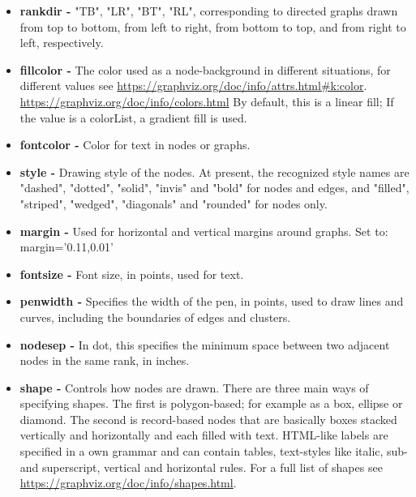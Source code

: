 \documentclass[a4paper, 12pt, bibliography=totoc]{scrartcl}
\begin{document}
\begin{itemize}
	\item \textbf{rankdir -} "TB", "LR", "BT", "RL", corresponding to directed graphs drawn from top to bottom, from left to right, from bottom to top, and from right to left, respectively.
	 
	\item \textbf{fillcolor -} The color used as a node-background in different situations, for different values see \url{https://graphviz.org/doc/info/attrs.html#k:color}. \url{https://graphviz.org/doc/info/colors.html} 
	By default, this is a linear fill; If the value is a colorList, a gradient fill is used. 
	
	\item \textbf{fontcolor -} Color for text in nodes or graphs. 
	
	\item \textbf{style -} Drawing style of the nodes.
	At present, the recognized style names are "dashed", "dotted", "solid", "invis" and "bold" for nodes and edges,  and "filled", "striped", "wedged", "diagonals" and "rounded" for nodes only.
	
	\item 
	\textbf{margin -} Used for horizontal and vertical margins around graphs. Set to: margin='0.11,0.01'
	
	\item \textbf{fontsize -} Font size, in points, used for text. 

	\item \textbf{penwidth -} Specifies the width of the pen, in points, used to draw lines and curves, including the boundaries of edges and clusters. 

	\item \textbf{nodesep -} In dot, this specifies the minimum space between two adjacent nodes in the same rank, in inches. 

	\item \textbf{shape -} Controls how nodes are drawn. There are three main ways of specifying shapes. The first is polygon-based; for example as a box, ellipse or diamond. The second is record-based nodes that are basically boxes stacked vertically and horizontally and each filled with text. HTML-like labels are specified in a own grammar and can contain tables, text-styles like italic, sub- and superscript, vertical and horizontal rules. For a full list of shapes see \url{https://graphviz.org/doc/info/shapes.html}.
\end{itemize}
\end{document}
